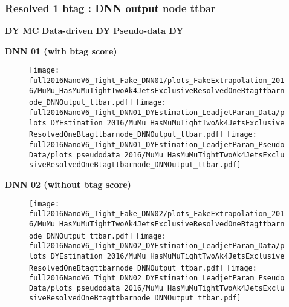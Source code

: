 \documentclass[9pt]{beamer}
\begin{document}
\begin{frame}
	\frametitle{Resolved 1 btag : DNN output node ttbar}
    \hspace{2cm} \textbf{DY MC} \hspace{1.9cm} \textbf{Data-driven DY} \hspace{1cm} \textbf{Pseudo-data DY}
    \begin{center}
        \textbf{DNN 01 (with btag score)}
    \end{center}
	\begin{figure}
		\texttt{[image: full2016NanoV6\_Tight\_Fake\_DNN01/plots\_FakeExtrapolation\_2016/MuMu\_HasMuMuTightTwoAk4JetsExclusiveResolvedOneBtagttbarnode\_DNNOutput\_ttbar.pdf]}
		\texttt{[image: full2016NanoV6\_Tight\_DNN01\_DYEstimation\_LeadjetParam\_Data/plots\_DYEstimation\_2016/MuMu\_HasMuMuTightTwoAk4JetsExclusiveResolvedOneBtagttbarnode\_DNNOutput\_ttbar.pdf]}
		\texttt{[image: full2016NanoV6\_Tight\_DNN01\_DYEstimation\_LeadjetParam\_PseudoData/plots\_pseudodata\_2016/MuMu\_HasMuMuTightTwoAk4JetsExclusiveResolvedOneBtagttbarnode\_DNNOutput\_ttbar.pdf]}
	\end{figure}
    \begin{center}
        \textbf{DNN 02 (without btag score)}
    \end{center}
	\begin{figure}
		\texttt{[image: full2016NanoV6\_Tight\_Fake\_DNN02/plots\_FakeExtrapolation\_2016/MuMu\_HasMuMuTightTwoAk4JetsExclusiveResolvedOneBtagttbarnode\_DNNOutput\_ttbar.pdf]}
		\texttt{[image: full2016NanoV6\_Tight\_DNN02\_DYEstimation\_LeadjetParam\_Data/plots\_DYEstimation\_2016/MuMu\_HasMuMuTightTwoAk4JetsExclusiveResolvedOneBtagttbarnode\_DNNOutput\_ttbar.pdf]}
		\texttt{[image: full2016NanoV6\_Tight\_DNN02\_DYEstimation\_LeadjetParam\_PseudoData/plots\_pseudodata\_2016/MuMu\_HasMuMuTightTwoAk4JetsExclusiveResolvedOneBtagttbarnode\_DNNOutput\_ttbar.pdf]}
	\end{figure}
\end{frame}
\end{document}
